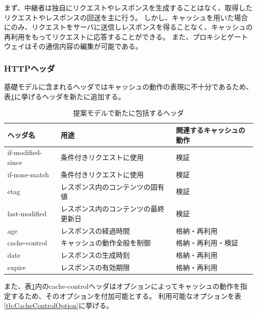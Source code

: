 \documentclass[12pt,a4paper]{jbook}
\begin{document}
まず、中継者は独自にリクエストやレスポンスを生成することはなく、取得したリクエストやレスポンスの回送を主に行う。
しかし、キャッシュを用いた場合にのみ、リクエストをサーバに送信しレスポンスを得ることなく、キャッシュの再利用をもってリクエストに応答することができる。
また、プロキシとゲートウェイはその通信内容の編集が可能である。

\subsubsection{HTTPヘッダ}
基礎モデルに含まれるヘッダではキャッシュの動作の表現に不十分であるため、表\ref{tb:ProposedModel-Headers}に挙げるヘッダを新たに追加する。

\begin{table}[htb]
\centering
\caption{提案モデルで新たに包括するヘッダ}
\label{tb:ProposedModel-Headers}
\begin{tabular}{lll}
\hline
ヘッダ名 & 用途 & 関連するキャッシュの動作 \\
\hline
if-modified-since & 条件付きリクエストに使用 & 検証 \\
if-none-match & 条件付きリクエストに使用 & 検証 \\
etag & レスポンス内のコンテンツの固有値 & 検証 \\
last-modified & レスポンス内のコンテンツの最終更新日 & 検証 \\
age & レスポンスの経過時間 & 格納・再利用 \\
cache-control & キャッシュの動作全般を制御 & 格納・再利用・検証 \\
date & レスポンスの生成時刻 & 格納・再利用 \\
expire & レスポンスの有効期限 & 格納・再利用 \\
\hline
\end{tabular}
\end{table}

また、表\ref{tb:ProposedModel-Headers}内のcache-controlヘッダはオプションによってキャッシュの動作を指定するため、そのオプションを付加可能とする。
利用可能なオプションを表\ref{tb:CacheControlOption}に挙げる。
\end{document}
